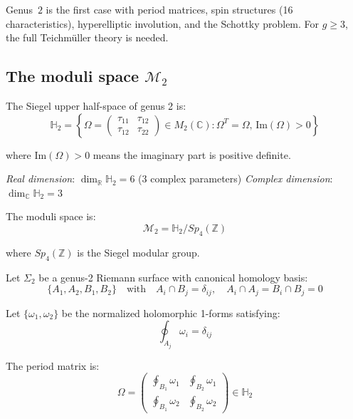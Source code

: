 \begin{remark}
\label{princ:genus2-special}
Genus~$2$ is the first case with period matrices, spin structures
(16 characteristics), hyperelliptic involution, and the Schottky
problem.  For $g\geq 3$, the full Teichm\"uller theory is needed.
\end{remark}

\subsection{\texorpdfstring{The moduli space $\mathcal{M}_2$}{The moduli space M-2}}

\begin{definition}
\label{def:siegel-h2}
The Siegel upper half-space of genus 2 is:
\begin{equation}
\mathbb{H}_2 = \left\{\Omega = \begin{pmatrix} \tau_{11} & \tau_{12} \\ \tau_{12} & \tau_{22} \end{pmatrix} \in M_2(\mathbb{C}) : 
\Omega^T = \Omega, \, \text{Im}(\Omega) > 0\right\}
\end{equation}

where $\text{Im}(\Omega) > 0$ means the imaginary part is positive definite.

\emph{Real dimension}: $\dim_{\mathbb{R}} \mathbb{H}_2 = 6$ (3 complex parameters)
\emph{Complex dimension}: $\dim_{\mathbb{C}} \mathbb{H}_2 = 3$

The moduli space is:
\begin{equation}
\mathcal{M}_2 = \mathbb{H}_2 / Sp_4(\mathbb{Z})
\end{equation}

where $Sp_4(\mathbb{Z})$ is the Siegel modular group.
\end{definition}

\begin{definition}
\label{def:period-matrix-g2}
Let $\Sigma_2$ be a genus-2 Riemann surface with canonical homology basis:
\begin{equation}
\{A_1, A_2, B_1, B_2\} \quad \text{with} \quad A_i \cap B_j = \delta_{ij}, \quad A_i \cap A_j = B_i \cap B_j = 0
\end{equation}

Let $\{\omega_1, \omega_2\}$ be the normalized holomorphic 1-forms satisfying:
\begin{equation}
\oint_{A_j} \omega_i = \delta_{ij}
\end{equation}

The period matrix is:
\begin{equation}
\Omega = \begin{pmatrix} 
\oint_{B_1} \omega_1 & \oint_{B_2} \omega_1 \\
\oint_{B_1} \omega_2 & \oint_{B_2} \omega_2
\end{pmatrix}
\in \mathbb{H}_2
\end{equation}
\end{definition}


